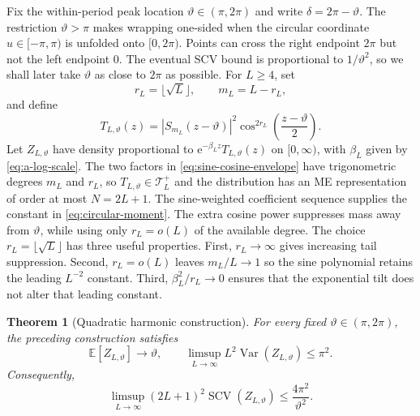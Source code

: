 \documentclass[11pt]{article}
\numberwithin{equation}{section}
\newtheorem{theorem}{Theorem}[section]
\theoremstyle{remark}
\newcommand{\E}{\mathbb E}
\newcommand{\Var}{\operatorname{Var}}
\newcommand{\SCV}{\operatorname{SCV}}
\newcommand{\e}{\mathrm e}
\newcommand{\Tcal}{\mathcal T}
\newcommand{\abs}[1]{\left|#1\right|}
\begin{document}
Fix the within-period peak location $\vartheta\in(\pi,2\pi)$ and write $\delta=2\pi-\vartheta$. The restriction $\vartheta>\pi$ makes wrapping one-sided when the circular coordinate $u\in[-\pi,\pi)$ is unfolded onto $[0,2\pi)$. Points can cross the right endpoint $2\pi$ but not the left endpoint $0$. The eventual SCV bound is proportional to $1/\vartheta^2$, so we shall later take $\vartheta$ as close to $2\pi$ as possible. For $L\geq4$, set
\[
  r_L=\lfloor\sqrt L\rfloor,\qquad m_L=L-r_L,
\]
and define
\begin{equation}\label{eq:sine-cosine-envelope}
  T_{L,\vartheta}(z)
  =\abs{S_{m_L}(z-\vartheta)}^2
    \cos^{2r_L}\!\left(\frac{z-\vartheta}{2}\right).
\end{equation}
Let $Z_{L,\vartheta}$ have density proportional to $\e^{-\beta_Lz}T_{L,\vartheta}(z)$ on $[0,\infty)$, with $\beta_L$ given by \eqref{eq:a-log-scale}. The two factors in \eqref{eq:sine-cosine-envelope} have trigonometric degrees $m_L$ and $r_L$, so $T_{L,\vartheta}\in\Tcal_L^+$ and the distribution has an ME representation of order at most $N=2L+1$. The sine-weighted coefficient sequence supplies the constant in \eqref{eq:circular-moment}. The extra cosine power suppresses mass away from $\vartheta$, while using only $r_L=o(L)$ of the available degree. The choice $r_L=\lfloor\sqrt L\rfloor$ has three useful properties. First, $r_L\to\infty$ gives increasing tail suppression. Second, $r_L=o(L)$ leaves $m_L/L\to1$ so the sine polynomial retains the leading $L^{-2}$ constant. Third, $\beta_L^2/r_L\to0$ ensures that the exponential tilt does not alter that leading constant.

\begin{theorem}[Quadratic harmonic construction]\label{thm:quadratic-construction}
For every fixed $\vartheta\in(\pi,2\pi)$, the preceding construction satisfies
\begin{equation}\label{eq:construction-moments}
  \E[Z_{L,\vartheta}]\longrightarrow\vartheta,
  \qquad
  \limsup_{L\to\infty}L^2\Var(Z_{L,\vartheta})\leq\pi^2.
\end{equation}
Consequently,
\begin{equation}\label{eq:construction-bound}
  \limsup_{L\to\infty}(2L+1)^2\SCV(Z_{L,\vartheta})
  \leq\frac{4\pi^2}{\vartheta^2}.
\end{equation}
\end{theorem}
\end{document}
